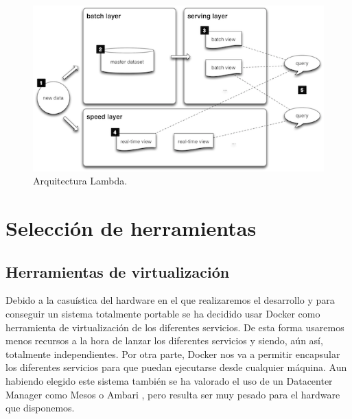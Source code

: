 \begin{figure}[htp]
\centering
\includegraphics[scale=0.70]{Imagenes/arq2.png}
\caption{Arquitectura Lambda.}
\label{arqLambda}
\end{figure}

\section{Selección de herramientas\label{toolSelect}}

\subsection{Herramientas de virtualización\label{hvirt}}

Debido a la casuística del hardware en el que realizaremos el desarrollo y
para conseguir un sistema totalmente portable se ha decidido usar Docker
como herramienta de virtualización de los diferentes servicios. De esta
forma usaremos menos recursos a la hora de lanzar los diferentes servicios
y siendo, aún así, totalmente independientes. Por otra parte, Docker nos va
a permitir encapsular los diferentes servicios para que puedan ejecutarse
desde cualquier máquina. Aun habiendo elegido este sistema también se ha
valorado el uso de un Datacenter Manager como Mesos o Ambari \cite{Hrr-1},
pero resulta ser muy pesado para el hardware que disponemos.


